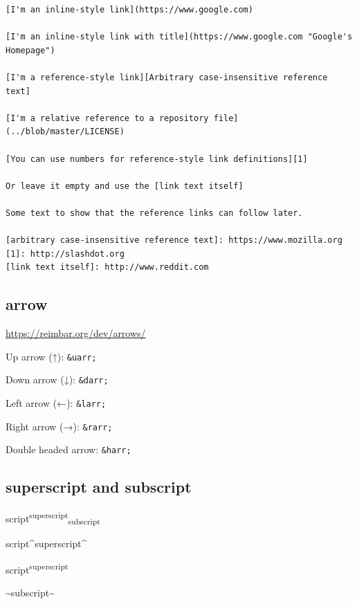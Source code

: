 \documentclass[
]{book}
\newenvironment{Shaded}{\begin{snugshade}}{\end{snugshade}}
\newcommand{\NormalTok}[1]{#1}
\theoremstyle{definition}
\theoremstyle{definition}
\theoremstyle{definition}
\theoremstyle{definition}
\theoremstyle{remark}
\begin{document}
\begin{verbatim}
[I'm an inline-style link](https://www.google.com)

[I'm an inline-style link with title](https://www.google.com "Google's Homepage")

[I'm a reference-style link][Arbitrary case-insensitive reference text]

[I'm a relative reference to a repository file](../blob/master/LICENSE)

[You can use numbers for reference-style link definitions][1]

Or leave it empty and use the [link text itself]

Some text to show that the reference links can follow later.

[arbitrary case-insensitive reference text]: https://www.mozilla.org
[1]: http://slashdot.org
[link text itself]: http://www.reddit.com
\end{verbatim}

\hypertarget{arrow}{%
\subsection{arrow}\label{arrow}}

\url{https://reimbar.org/dev/arrows/}

Up arrow (↑): \texttt{\&uarr;}

Down arrow (↓): \texttt{\&darr;}

Left arrow (←): \texttt{\&larr;}

Right arrow (→): \texttt{\&rarr;}

Double headed arrow: \texttt{\&harr;}

\hypertarget{superscript-and-subscript}{%
\subsection{superscript and subscript}\label{superscript-and-subscript}}

script\textsuperscript{superscript}\textsubscript{subscript}

\begin{Shaded}
\begin{Highlighting}[]
\NormalTok{script\^{}superscript\^{}}
\end{Highlighting}
\end{Shaded}

script\textsuperscript{superscript}

\begin{Shaded}
\begin{Highlighting}[]
\NormalTok{\textasciitilde{}subscript\textasciitilde{}}
\end{Highlighting}
\end{Shaded}
\end{document}
